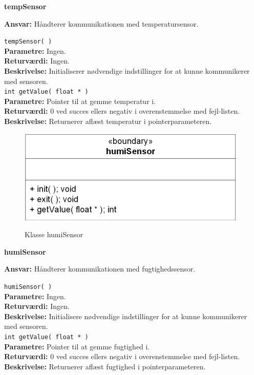 {\centering
\textbf{tempSensor}\par
}
\textbf{Ansvar:} Håndterer kommunikationen med temperatursensor. \

\verb+tempSensor( )+ \\
\textbf{Parametre:} Ingen. \\
\textbf{Returværdi:} Ingen. \\
\textbf{Beskrivelse:} Initialiserer nødvendige indstillinger for at kunne kommunikerer med sensoren. \\

\verb+int getValue( float * )+ \\
\textbf{Parametre:} Pointer til at gemme temperatur i. \\
\textbf{Returværdi:} 0 ved succes ellers negativ i overenstemmelse med fejl-listen. \\
\textbf{Beskrivelse:} Returnerer aflæst temperatur i pointerparameteren. \\


\begin{figure}[htbp] \centering
{\includegraphics[scale=1.3]{filer/design/Klassediagrammer/sw_psoc_humiSensor}}
\caption{Klasse humiSensor}
\label{fig:sw_psoc_class_humiSensor}
\end{figure} 

{\centering
\textbf{humiSensor}\par
}
\textbf{Ansvar:} Håndterer kommunikationen med fugtighedssensor. \

\verb+humiSensor( )+ \\
\textbf{Parametre:} Ingen. \\
\textbf{Returværdi:} Ingen. \\
\textbf{Beskrivelse:} Initialisere nødvendige indstillinger for at kunne kommunikerer med sensoren. \\

\verb+int getValue( float * )+ \\
\textbf{Parametre:} Pointer til at gemme fugtighed i. \\
\textbf{Returværdi:} 0 ved succes ellers negativ i overenstemmelse med fejl-listen. \\
\textbf{Beskrivelse:} Returnerer aflæst fugtighed i pointerparameteren. \\


